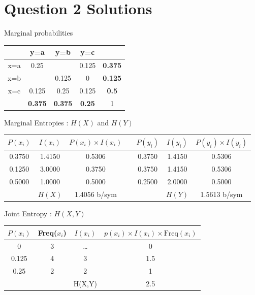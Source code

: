 \documentclass[a4paper,12pt]{article}
\begin{document}
\section*{Question 2 Solutions}
Marginal probabilities
\begin{center}
\begin{tabular}{|c|c|c|c||c|}
\hline	&	y=a	&	y=b	&	y=c	&		\\ \hline
x=a	&	0.25	&		&	0.125	&	\textbf{0.375}	\\ \hline
x=b	&		&	0.125	&	0	&	\textbf{0.125}	\\ \hline
x=c	&	0.125	&	0.25	&	0.125	&	\textbf{0.5	}\\ \hline \hline
	&	\textbf{0.375}	&	\textbf{0.375}	&	\textbf{0.25}	&	1	\\ \hline
\end{tabular}
\end{center}
Marginal Entropies : $H(X)$ and $H(Y)$
\begin{center}
\begin{tabular}{|c|c|c||c||c|c|c|} \hline
$P(x_i)$	&	$I(x_i)$	&	$P(x_i) \times I(x_i)$	&&	$P(y_i)$	&	$I(y_i)$	&	$P(y_i) \times I(y_i)$	\\ \hline \hline
0.3750	&	1.4150	&	0.5306	&&	0.3750	&	1.4150	&	0.5306	\\ \hline
0.1250	&	3.0000	&	0.3750	&&	0.3750	&	1.4150	&	0.5306	\\ \hline
0.5000	&	1.0000	&	0.5000	&&	0.2500	&	2.0000	&	0.5000	\\ \hline \hline
	&	$H(X)$	&	1.4056 b/sym	&&		&	$H(Y)$	&	1.5613 b/sym	\\ \hline
\end{tabular} 
\end{center}
Joint Entropy : $H(X,Y)$
\begin{center}
\begin{tabular}{|c|c|c|c|}
\hline
$P(x_i)$	&	Freq($x_i$)	&	$I(x_i)$	&	$p(x_i)\times I(x_i) \times \mbox{Freq}(x_i)$	\\ \hline
0	&	3	&	\ldots &	0	\\ \hline
0.125	&	4	&	3	&	1.5	\\ \hline
0.25	&	2	&	2	&	1	\\ \hline \hline
& &H(X,Y) & 2.5 \\ \hline
\end{tabular} 
\end{center}
\end{document}
